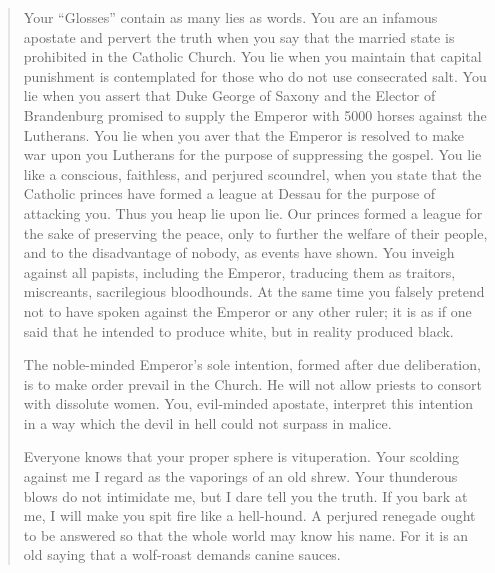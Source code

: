 \begin{quote}
Your “Glosses” contain as many lies as words. You are an infamous apostate
and pervert the truth when you say that the married state is prohibited
in the Catholic Church. You lie when you maintain that capital punishment
is contemplated for those who do not use consecrated salt. You lie when you
assert that Duke George of Saxony and the Elector of Brandenburg
promised to supply the Emperor with 5000 horses against the Lutherans. You
lie when you aver that the Emperor is resolved to make war upon
you Lutherans for the purpose of suppressing the gospel. You lie like a conscious,
faithless, and perjured scoundrel, when you state that the Catholic princes
have formed a league at Dessau for the purpose of attacking you. Thus you
heap lie upon lie. Our princes formed a league for the sake of preserving the
peace, only to further the welfare of their people, and to the disadvantage
of nobody, as events have shown. You inveigh against all papists, including
the Emperor, traducing them as traitors, miscreants, sacrilegious
bloodhounds. At the same time you falsely pretend not to have spoken
against the Emperor or any other ruler; it is as if one said that he intended
to produce white, but in reality produced black.

The noble-minded Emperor’s sole intention, formed after due deliberation,
is to make order prevail in the Church. He will not allow priests to consort
with dissolute women. You, evil-minded apostate, interpret this intention in
a way which the devil in hell could not surpass in malice.

Everyone knows that your proper sphere is vituperation. Your scolding
against me I regard as the vaporings of an old shrew. Your thunderous blows
do not intimidate me, but I dare tell you the truth. If you bark at me, I
will make you spit fire like a hell-hound. A perjured renegade ought to be
answered so that the whole world may know his name. For it is an old
saying that a wolf-roast demands canine sauces.


\end{quote}
